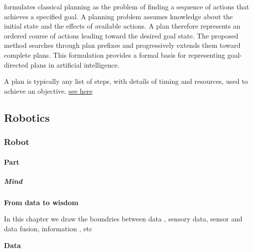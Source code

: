 \documentclass{book}
\newcommand{\seehere}[1]{\href{#1}{see here}}
\providecommand{\ProjectDeepHeading}[2]{%
    \par\medskip\noindent\textbf{#2}\par\smallskip
}
\providecommand{\seehere}[1]{\href{#1}{see here}}
\begin{document}
      \cite{mcdermott-1999-using-regression-match-graphs-to-control-search-in-planning} formulates classical planning as the problem of finding a sequence of actions that achieves a specified goal. A planning problem assumes knowledge about the initial state and the effects of available actions. A plan therefore represents an ordered course of actions leading toward the desired goal state. The proposed method searches through plan prefixes and progressively extends them toward complete plans. This formulation provides a formal basis for representing goal-directed plans in artificial intelligence.

      A plan is typically any list of steps, with details of timing and resources, used to achieve an objective. \seehere{https://en.wikipedia.org/wiki/Plan}

\subsection{Robotics}

\subsubsection{Robot}

\paragraph{Part}

\subparagraph{Mind}

\ProjectDeepHeading{1}{From data to wisdom}


In this chapter we draw the boundries between data , sensory data, sensor and data fusion, information , etc
        
        
        \ProjectDeepHeading{4}{Data}
        
\end{document}
